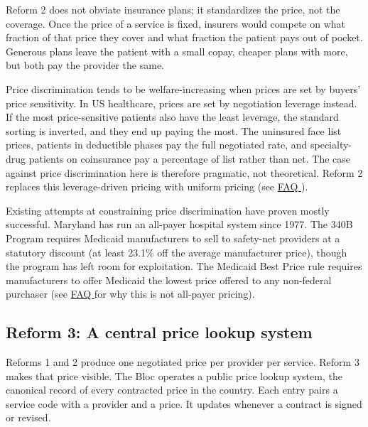 \documentclass[12pt]{article}
\begin{document}
Reform 2 does not obviate insurance plans; it standardizes the price, not the coverage. Once the price of a service is fixed, insurers would compete on what fraction of that price they cover and what fraction the patient pays out of pocket. Generous plans leave the patient with a small copay, cheaper plans with more, but both pay the provider the same.

Price discrimination tends to be welfare-increasing when prices are set by buyers' price sensitivity.\citep{varian1985pd} In US healthcare, prices are set by negotiation leverage instead. If the most price-sensitive patients also have the least leverage, the standard sorting is inverted, and they end up paying the most. The uninsured face list prices,\citep{dusetzina2016uninsured, bai2015markup} patients in deductible phases pay the full negotiated rate, and specialty-drug patients on coinsurance pay a percentage of list rather than net. The case against price discrimination here is therefore pragmatic, not theoretical.\citep{reinhardt2011allpayer, anderson2015allpayer} Reform 2 replaces this leverage-driven pricing with uniform pricing (see \href{https://rabbanimaysam.github.io/health_reform/faq.html}{FAQ \faqInvertedSchedule}).

Existing attempts at constraining price discrimination have proven mostly successful. Maryland has run an all-payer hospital system since 1977.\citep{murray2009maryland} The 340B Program requires Medicaid manufacturers to sell to safety-net providers at a statutory discount (at least 23.1\% off the average manufacturer price),\citep{medpac2015340b, ecfr447509} though the program has left room for exploitation.\citep{conti2014340b} The Medicaid Best Price rule requires manufacturers to offer Medicaid the lowest price offered to any non-federal purchaser (see \href{https://rabbanimaysam.github.io/health_reform/faq.html}{FAQ \faqAllPayer} for why this is not all-payer pricing).

\subsection*{Reform 3: A central price lookup system}

Reforms 1 and 2 produce one negotiated price per provider per service. Reform 3 makes that price visible. The Bloc operates a public price lookup system, the canonical record of every contracted price in the country. Each entry pairs a service code with a provider and a price. It updates whenever a contract is signed or revised.
\end{document}
